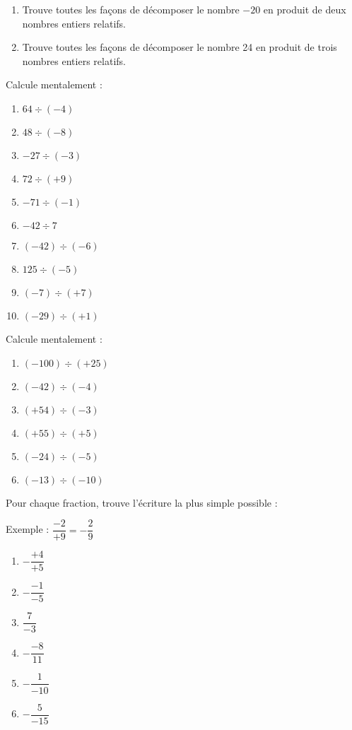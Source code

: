 \columnbreak
\begin{exercice}[Décompositions...]
\begin{enumerate}
\item Trouve toutes les façons de décomposer le nombre $-20$ en produit de deux nombres entiers relatifs.
\item Trouve toutes les façons de décomposer le nombre 24 en produit de trois nombres entiers relatifs.
\end{enumerate}
\end{exercice} 






\begin{exercice}Calcule mentalement :
\begin{enumerate}
\item $64 \div (-4)$
\item $48 \div (-8)$
\item $-27 \div (-3)$
\item $72 \div (+9)$
\item $-71 \div ( -1)$
\item $-42 \div 7$
\item $(-42) \div (-6)$
\item $125 \div (-5)$
\item $(-7) \div (+7)$
\item $(-29) \div (+1)$
\end{enumerate}
\end{exercice}



\begin{exercice}Calcule mentalement :
\begin{enumerate}
\item $(-100) \div (+25)$
\item $(-42) \div (-4)$
\item $(+54) \div (-3)$
\item $(+55) \div (+5)$
\item $(-24) \div (-5)$
\item $(-13) \div (-10)$
\end{enumerate}
\end{exercice}


\begin{exercice}Pour chaque fraction, trouve l'écriture la plus simple possible : 

Exemple : $\dfrac{-2}{+9}=-\dfrac{2}{9}$
\begin{enumerate}
\item $-\dfrac{+4}{+5}$
\item $-\dfrac{-1}{-5}$
\item $\dfrac{7}{-3}$
\item $-\dfrac{-8}{11}$
\item $-\dfrac{1}{-10}$
\item $-\dfrac{5}{-15}$
\end{enumerate}
\end{exercice}


